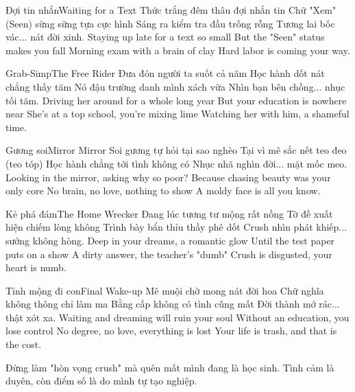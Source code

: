 \begin{tutuyetbox}{Đợi tin nhắn}{Waiting for a Text}
Thức trắng đêm thâu đợi nhắn tin
Chữ "Xem" (Seen) sừng sững tựa cực hình
Sáng ra kiểm tra đầu trống rỗng
Tương lai bốc vác... nát đời xinh.
\tcblower
Staying up late for a text so small
But the "Seen" status makes you fall
Morning exam with a brain of clay
Hard labor is coming your way.
\end{tutuyetbox}

\begin{tutuyetbox}{Grab-Simp}{The Free Rider}
Đưa đón người ta suốt cả năm
Học hành dốt nát chẳng thấy tăm
Nó đậu trường danh mình xách vữa
Nhìn bạn bên chồng... nhục tối tăm.
\tcblower
Driving her around for a whole long year
But your education is nowhere near
She's at a top school, you're mixing lime
Watching her with him, a shameful time.
\end{tutuyetbox}

\begin{tutuyetbox}{Gương soi}{Mirror Mirror}
Soi gương tự hỏi tại sao nghèo
Tại vì mê sắc nết teo đeo (teo tóp)
Học hành chẳng tới tình không có
Nhục nhã nghìn đời... mặt mốc meo.
\tcblower
Looking in the mirror, asking why so poor?
Because chasing beauty was your only core
No brain, no love, nothing to show
A moldy face is all you know.
\end{tutuyetbox}

\begin{tutuyetbox}{Kẻ phá đám}{The Home Wrecker}
Đang lúc tương tư mộng rất nồng
Tờ đề xuất hiện chiếm lòng không
Trình bày bẩn thỉu thầy phê dốt
Crush nhìn phát khiếp... sướng không hòng.
\tcblower
Deep in your dreams, a romantic glow
Until the test paper puts on a show
A dirty answer, the teacher's "dumb"
Crush is disgusted, your heart is numb.
\end{tutuyetbox}

\begin{tutuyetbox}{Tỉnh mộng đi con}{Final Wake-up}
Mê muội chờ mong nát đời hoa
Chữ nghĩa không thông chỉ làm ma
Bằng cấp không có tình cũng mất
Đời thành mớ rác... thật xót xa.
\tcblower
Waiting and dreaming will ruin your soul
Without an education, you lose control
No degree, no love, everything is lost
Your life is trash, and that is the cost.
\end{tutuyetbox}

\begin{ghichu}
Đừng làm "hòn vọng crush" mà quên mất mình đang là học sinh. Tình cảm là duyên, còn điểm số là do mình tự tạo nghiệp.
\end{ghichu}